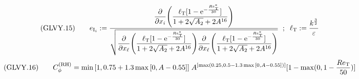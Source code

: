 \documentclass{article}
\begin{document}
\begin{equation}
({\rm GLVY}.15)\qquad
                e_{\mathrm{\tiny I}_i}:=\frac{\displaystyle\frac{\partial}{\partial x_i}\Biggl(\frac{\ell_\mathrm{\tiny T}[1-\mathrm{e}^{-{\frac{Re^*_\mathrm{\tiny T}}
                                                                                                             {         30}}}]}
                                                                           {1+2\sqrt{A_2}+2A^{16}}
                                                             \Biggr)
                                               }
                                               {\sqrt{\displaystyle\frac{\partial}{\partial x_\ell}\Biggl(\frac{\ell_\mathrm{\tiny T}[1-\mathrm{e}^{-{\frac{Re^*_\mathrm{\tiny T}}
                                                                                                             {         30}}}]}
                                                                           {1+2\sqrt{A_2}+2A^{16}}
                                                             \Biggr)
                                                      \displaystyle\frac{\partial}{\partial x_\ell}\Biggl(\frac{\ell_\mathrm{\tiny T}[1-\mathrm{e}^{-{\frac{Re^*_\mathrm{\tiny T}}
                                                                                                             {         30}}}]}
                                                                           {1+2\sqrt{A_2}+2A^{16}}
                                                             \Biggr)
                                                     }
                                               }\;\; ; \;\;
\ell_{\mathrm{\tiny T}}:=\frac{k^\frac{3}{2}}{\varepsilon}
\end{equation}
\begin{equation}
({\rm GLVY}.16)\qquad
C_\phi^{(\mathrm{\tiny RH})}=\min{\left[1,0.75+1.3\max{[0,A-0.55]}\right]}\;A^{[\max(0.25,0.5-1.3\max{[0,A-0.55]})]}[1-\max(0,1-{\frac{Re_\mathrm{\tiny T}}
                                                                                                                                    {50        }})]
\end{equation}
\end{document}
